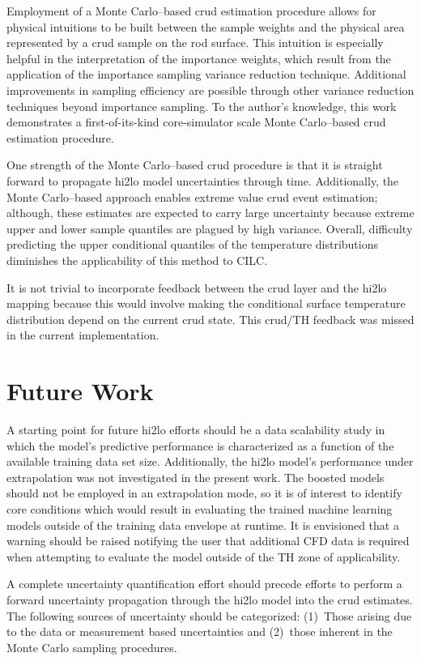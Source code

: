 Employment of a Monte Carlo--based crud estimation procedure allows for physical intuitions to be built between the sample weights and the physical area represented by a crud sample on the rod surface.  This intuition is especially helpful in the interpretation of the importance weights, which result from the application of the importance sampling variance reduction technique.  Additional improvements in sampling efficiency are possible through other variance reduction techniques beyond importance sampling.  To the author's knowledge, this work demonstrates a first-of-its-kind core-simulator scale Monte Carlo--based crud estimation procedure.

One strength of the Monte Carlo--based crud procedure is that it is straight forward to propagate hi2lo model uncertainties through time.  Additionally, the Monte Carlo--based approach enables extreme value crud event estimation; although, these estimates are expected to carry large uncertainty because extreme upper and lower sample quantiles are plagued by high variance.  Overall, difficulty predicting the upper conditional quantiles of the temperature distributions diminishes the applicability of this method to CILC.

It is not trivial to incorporate feedback between the crud layer and the hi2lo mapping because this would involve making the conditional surface temperature distribution depend on the current crud state.  This crud/TH feedback was missed in the current implementation.


\section{Future Work}

A starting point for future hi2lo efforts should be a data scalability study in which the model's predictive performance is characterized as a function of the available training data set size.  Additionally,
the hi2lo model's performance under extrapolation was not investigated in the present work.  The boosted models should not be employed in an extrapolation mode, so it is of interest to identify core conditions which would result in evaluating the trained machine learning models outside of the training data envelope at runtime.  It is envisioned that a warning should be raised notifying the user that additional CFD data is required when attempting to evaluate the model outside of the TH zone of applicability.

A complete uncertainty quantification effort should precede efforts to perform a forward uncertainty propagation through the hi2lo model into the crud estimates.  The following sources of uncertainty should be categorized: (1)~Those arising due to the data or measurement based uncertainties and (2)~those inherent in the Monte Carlo sampling procedures.

